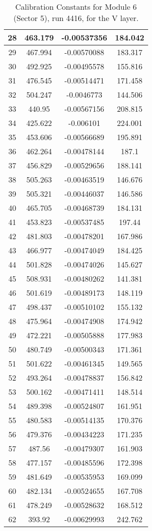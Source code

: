 \begin{table}[h]
{\begin{tabular}{|c|c|c|c|}
28	&	463.179	&	-0.00537356	&	184.042	\\	\hline
29	&	467.994	&	-0.00570088	&	183.317	\\	\hline
30	&	492.925	&	-0.00495578	&	155.816	\\	\hline
31	&	476.545	&	-0.00514471	&	171.458	\\	\hline
32	&	504.247	&	-0.0046773	&	144.506	\\	\hline
33	&	440.95	&	-0.00567156	&	208.815	\\	\hline
34	&	425.622	&	-0.006101	&	224.001	\\	\hline
35	&	453.606	&	-0.00566689	&	195.891	\\	\hline
36	&	462.264	&	-0.00478144	&	187.1	\\	\hline
37	&	456.829	&	-0.00529656	&	188.141	\\	\hline
38	&	505.263	&	-0.00463519	&	146.676	\\	\hline
39	&	505.321	&	-0.00446037	&	146.586	\\	\hline
40	&	465.705	&	-0.00468739	&	184.131	\\	\hline
41	&	453.823	&	-0.00537485	&	197.44	\\	\hline
42	&	481.803	&	-0.00478201	&	167.986	\\	\hline
43	&	466.977	&	-0.00474049	&	184.425	\\	\hline
44	&	501.828	&	-0.00474026	&	145.627	\\	\hline
45	&	508.931	&	-0.00480262	&	141.381	\\	\hline
46	&	501.619	&	-0.00489173	&	148.119	\\	\hline
47	&	498.437	&	-0.00510102	&	155.132	\\	\hline
48	&	475.964	&	-0.00474908	&	174.942	\\	\hline
49	&	472.221	&	-0.00505888	&	177.983	\\	\hline
50	&	480.749	&	-0.00500343	&	171.361	\\	\hline
51	&	501.622	&	-0.00461345	&	149.565	\\	\hline
52	&	493.264	&	-0.00478837	&	156.842	\\	\hline
53	&	500.162	&	-0.00471411	&	148.514	\\	\hline
54	&	489.398	&	-0.00524807	&	161.951	\\	\hline
55	&	480.583	&	-0.00514135	&	170.376	\\	\hline
56	&	479.376	&	-0.00434223	&	171.235	\\	\hline
57	&	487.56	&	-0.00479307	&	161.903	\\	\hline
58	&	477.157	&	-0.00485596	&	172.398	\\	\hline
59	&	481.649	&	-0.00535953	&	169.099	\\	\hline
60	&	482.134	&	-0.00524655	&	167.708	\\	\hline
61	&	478.249	&	-0.00528632	&	168.512	\\	\hline
62	&	393.92	&	-0.00629993	&	242.762	\\	\hline
            \end{tabular}
        }
        \caption{Calibration Constants for Module 6 (Sector 5), run 4416, for the V layer.}
\end{table}



